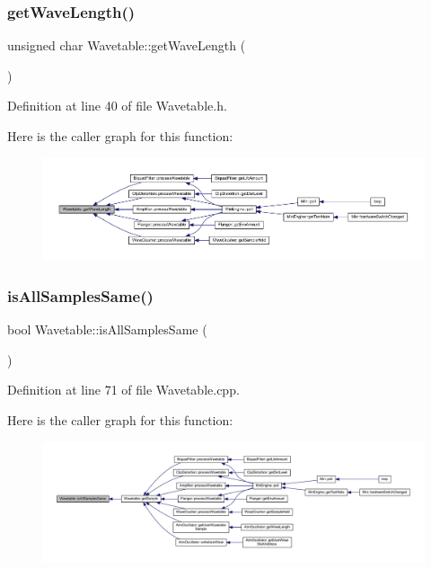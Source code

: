 \subsubsection{\texorpdfstring{get\+Wave\+Length()}{getWaveLength()}}
{\footnotesize\ttfamily unsigned char Wavetable\+::get\+Wave\+Length (\begin{DoxyParamCaption}{ }\end{DoxyParamCaption})\hspace{0.3cm}{\ttfamily [inline]}}



Definition at line 40 of file Wavetable.\+h.

Here is the caller graph for this function\+:
\nopagebreak
\begin{figure}[H]
\begin{center}
\leavevmode
\includegraphics[width=350pt]{d8/d3f/class_wavetable_ac7f597021cdace95c4e1e4c88fc36d2a_icgraph}
\end{center}
\end{figure}
\mbox{\label{class_wavetable_aeb61e3ae23fc19d5578c5893323b0490}} 
\subsubsection{\texorpdfstring{is\+All\+Samples\+Same()}{isAllSamplesSame()}}
{\footnotesize\ttfamily bool Wavetable\+::is\+All\+Samples\+Same (\begin{DoxyParamCaption}{ }\end{DoxyParamCaption})}



Definition at line 71 of file Wavetable.\+cpp.

Here is the caller graph for this function\+:
\nopagebreak
\begin{figure}[H]
\begin{center}
\leavevmode
\includegraphics[width=350pt]{d8/d3f/class_wavetable_aeb61e3ae23fc19d5578c5893323b0490_icgraph}
\end{center}
\end{figure}
\mbox{\label{class_wavetable_ad54063d548eeb7b1fad18543d4ff15c1}} 
